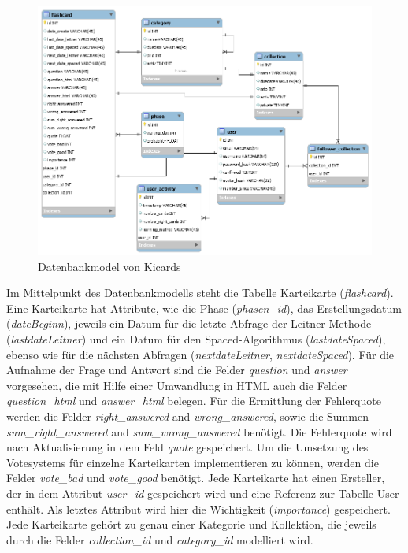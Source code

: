 \begin{figure}[htbp]
 \includegraphics[width = 15cm]{databasemodel.png}
 \caption{Datenbankmodel von Kicards}
 \label{fig:datenbankmodel}
\end{figure}


Im Mittelpunkt des Datenbankmodells steht die Tabelle Karteikarte (\emph{flashcard}). Eine Karteikarte hat Attribute, wie die Phase (\emph{phasen{\_}id}), das Erstellungsdatum (\emph{dateBeginn}), jeweils ein Datum für die letzte Abfrage der Leitner-Methode (\emph{lastdateLeitner}) und ein Datum für den Spaced-Algorithmus (\emph{lastdateSpaced}), ebenso wie für die nächsten Abfragen (\emph{nextdateLeitner}, \emph{nextdateSpaced}). Für die Aufnahme der Frage und Antwort sind die Felder \emph{question} und \emph{answer} vorgesehen, die mit Hilfe einer Umwandlung in HTML auch die Felder \emph{question{\_}html} und \emph{answer{\_}html} belegen. Für die Ermittlung der Fehlerquote werden die Felder \emph{right{\_}answered} and \emph{wrong{\_}answered}, sowie die Summen \emph{sum{\_}right{\_}answered} and \emph{sum{\_}wrong{\_}answered} benötigt. Die Fehlerquote wird nach Aktualisierung in dem Feld \emph{quote} gespeichert. Um die Umsetzung des Votesystems für einzelne Karteikarten implementieren zu können, werden die Felder \emph{vote{\_}bad} und \emph{vote{\_}good} benötigt. Jede Karteikarte hat einen Ersteller, der in dem Attribut \emph{user{\_}id} gespeichert wird und eine Referenz zur Tabelle User enthält. Als letztes Attribut wird hier die Wichtigkeit (\emph{importance}) gespeichert. Jede Karteikarte gehört zu genau einer Kategorie und Kollektion, die jeweils durch die Felder \emph{collection{\_}id} und \emph{category{\_}id} modelliert wird.

